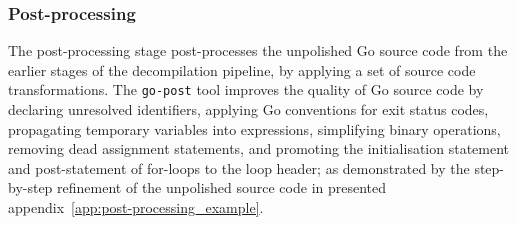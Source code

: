 
\subsubsection{Post-processing}
\label{sec:design_post-processing}

The post-processing stage post-processes the unpolished Go source code from the earlier stages of the decompilation pipeline, by applying a set of source code transformations. The \texttt{go-post} tool improves the quality of Go source code by declaring unresolved identifiers, applying Go conventions for exit status codes, propagating temporary variables into expressions, simplifying binary operations, removing dead assignment statements, and promoting the initialisation statement and post-statement of for-loops to the loop header; as demonstrated by the step-by-step refinement of the unpolished source code in presented appendix~\ref{app:post-processing_example}.
